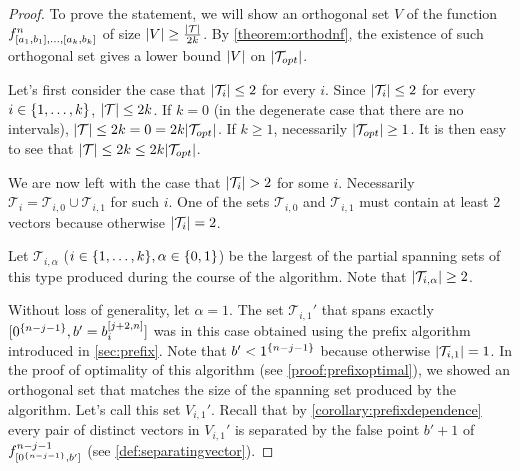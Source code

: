 \begin{proof}
To prove the statement,
we will show an orthogonal set $V$ of the function
$f^n_{[a_1, b_1], \ldots, [a_k, b_k]}$
of size
$\lvert V\rvert \geq \frac{\lvert\mathcal{T}\rvert}{2k}$.
By \cref{theorem:orthodnf},
the existence of such orthogonal set
gives a lower bound $\lvert V\rvert$
on $\lvert\mathcal{T}_{opt}\rvert$.

Let's first consider the case that
$\lvert\mathcal{T}_i\rvert \leq 2$ for every $i$.
Since $\lvert\mathcal{T}_i\rvert \leq 2$
for every $i \in \{1, \ldots, k\}$,
$\lvert\mathcal{T}\rvert \leq 2k$.
If $k = 0$
(in the degenerate case that there are no intervals),
$\lvert\mathcal{T}\rvert \leq 2k = 0
= 2k \lvert\mathcal{T}_{opt}\rvert$.
If $k \geq 1$,
necessarily $\lvert\mathcal{T}_{opt}\rvert \geq 1$.
It is then easy to see that
$\lvert\mathcal{T}\rvert
\leq 2k \leq 2k \lvert\mathcal{T}_{opt}\rvert$.

We are now left with the case that
$\lvert\mathcal{T}_i\rvert > 2$ for some $i$.
Necessarily $\mathcal{T}_i
= \mathcal{T}_{i,0} \cup \mathcal{T}_{i,1}$
for such $i$.
One of the sets
$\mathcal{T}_{i,0}$ and $\mathcal{T}_{i,1}$
must contain at least $2$ vectors
because otherwise $\lvert\mathcal{T}_i\rvert = 2$.

Let $\mathcal{T}_{i, \alpha}$
($i \in \{1, \ldots, k\}, \alpha \in \{0, 1\}$)
be the largest
of the partial spanning sets of this type
produced during the course of the algorithm.
Note that $\lvert\mathcal{T}_{i,\alpha}\rvert \geq 2$.

Without loss of generality,
let $\alpha = 1$.
The set $\mathcal{T}_{i, 1}'$
that spans exactly
$[0^{\{n-j-1\}}, b' = b_i^{[j+2, n]}]$
was in this case obtained
using the prefix algorithm
introduced in \cref{sec:prefix}.
Note that $b' < 1^{\{n-j-1\}}$
because otherwise $\lvert\mathcal{T}_{i,1}\rvert = 1$.
In the proof of optimality of this algorithm
(see \cref{proof:prefixoptimal}),
we showed an orthogonal set that matches the size
of the spanning set produced by the algorithm.
Let's call this set $V_{i, 1}'$.
Recall that by \cref{corollary:prefixdependence}
every pair of distinct vectors in $V_{i, 1}'$
is separated by the false point $b' + 1$
of $f^{n-j-1}_{[0^{\{n-j-1\}}, b']}$
(see \cref{def:separatingvector}).


\end{proof}
